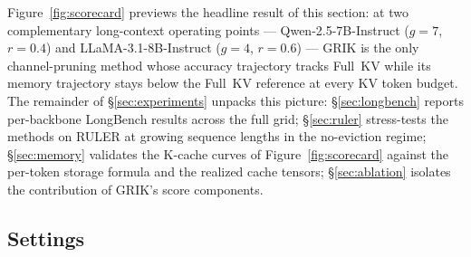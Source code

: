 \documentclass{article}
\begin{document}
Figure~\ref{fig:scorecard} previews the headline result of this section: at two complementary long-context operating points --- Qwen-2.5-7B-Instruct ($g{=}7$, $r{=}0.4$) and LLaMA-3.1-8B-Instruct ($g{=}4$, $r{=}0.6$) --- GRIK is the only channel-pruning method whose accuracy trajectory tracks Full~KV while its memory trajectory stays below the Full~KV reference at every KV token budget. The remainder of \S\ref{sec:experiments} unpacks this picture: \S\ref{sec:longbench} reports per-backbone LongBench results across the full grid; \S\ref{sec:ruler} stress-tests the methods on RULER at growing sequence lengths in the no-eviction regime; \S\ref{sec:memory} validates the K-cache curves of Figure~\ref{fig:scorecard} against the per-token storage formula and the realized cache tensors; \S\ref{sec:ablation} isolates the contribution of GRIK's score components.
 










\subsection{Settings}
\label{sec:settings}
\end{document}
